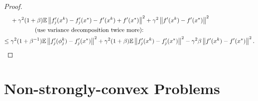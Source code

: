 \documentclass{article}
\newcommand{\stepsize}{\gamma} %
\begin{document}
\begin{proof}
\begin{align*}
 & + \stepsize^{2}(1+\beta) \mathbb{E}\left\Vert f_{j}^{\prime}(x^k)-f_{j}^{\prime}(x^{*}) 
       - f^{\prime}(x^k) + f^{\prime}(x^{*}) \right\Vert ^{2}
    + \stepsize^{2}\left\Vert f^{\prime}(x^k)-f^{\prime}(x^{*}) \right\Vert ^{2}\\
 & \textrm{\qquad \qquad (use variance decomposition twice more):} \\
 \leq {} & \stepsize^{2}(1+\beta^{-1})\mathbb{E}\left\Vert f_{j}^{\prime}(\phi_{j}^{k})-f_{j}^{\prime}(x^{*})\right\Vert ^{2}+\stepsize^{2}(1+\beta)\mathbb{E}\left\Vert f_{j}^{\prime}(x^k)-f_{j}^{\prime}(x^{*})\right\Vert ^{2} - \stepsize^{2} \beta \left\Vert f^{\prime}(x^k)-f^{\prime}(x^{*}) \right\Vert ^{2}.
\end{align*}
\endgroup
\end{proof}



\section{Non-strongly-convex Problems}
\end{document}
